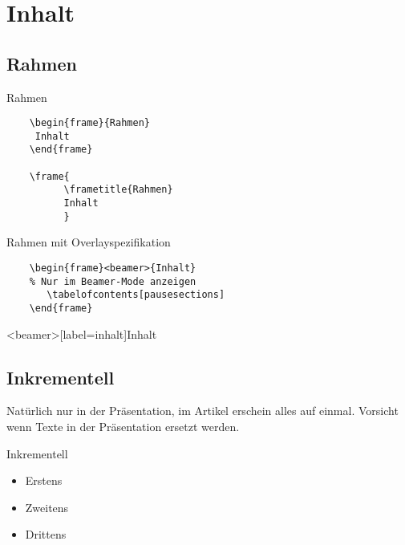 \section{Inhalt}
\subsection{Rahmen}
\begin{frame}[label=rahmen1,fragile]{Rahmen}
  \begin{verbatim}
    \begin{frame}{Rahmen}
     Inhalt
    \end{frame}
    
    \frame{
          \frametitle{Rahmen}
          Inhalt
          }
  \end{verbatim}
\end{frame}

\begin{frame}[label=rahmen2,fragile]{Rahmen mit Overlayspezifikation}
  \begin{verbatim}
    \begin{frame}<beamer>{Inhalt}
    % Nur im Beamer-Mode anzeigen 
       \tabelofcontents[pausesections]
    \end{frame}
  \end{verbatim}
\end{frame}

\begin{frame}<beamer>[label=inhalt]{Inhalt}
    \tableofcontents[pausesections]
\end{frame}

\subsection{Inkrementell}

Natürlich nur in der Präsentation, im Artikel erschein alles auf einmal.
Vorsicht wenn Texte in der Präsentation ersetzt werden.

\begin{frame}[label=inkrementell1]{Inkrementell}
  \begin{itemize}[<+->]
    \item Erstens
    \item Zweitens
    \item Drittens
  \end{itemize}
\end{frame}

